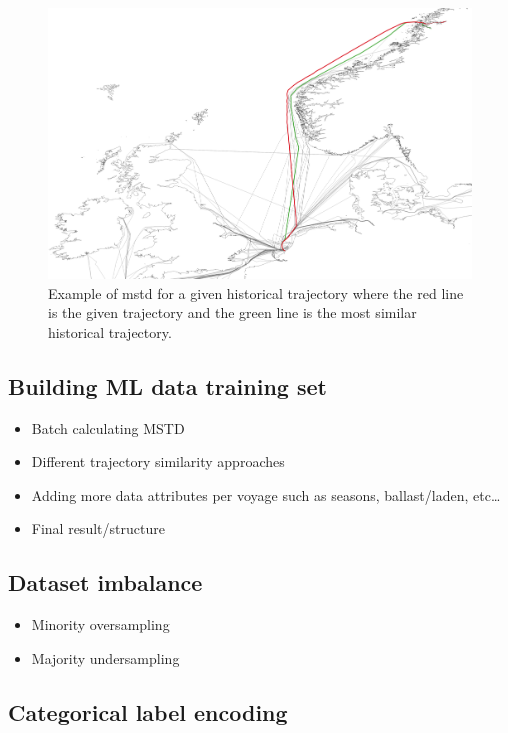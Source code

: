 \begin{figure}[htbp]  %
    \centering
    \includegraphics[width=1.0\textwidth]{figures/mstd}
    \caption{Example of \acrshort{mstd} for a given historical trajectory where the red line is the given trajectory and the green line is the most similar historical trajectory.}
    \label{fig:mstd}
\end{figure}


\subsection{Building ML data training set}

\begin{itemize}
    \item Batch calculating MSTD
    \item Different trajectory similarity approaches
    \item Adding more data attributes per voyage such as seasons, ballast/laden, etc\ldots
    \item Final result/structure
\end{itemize}

\subsection{Dataset imbalance}

\begin{itemize}
    \item Minority oversampling
    \item Majority undersampling
\end{itemize}

\subsection{Categorical label encoding}

